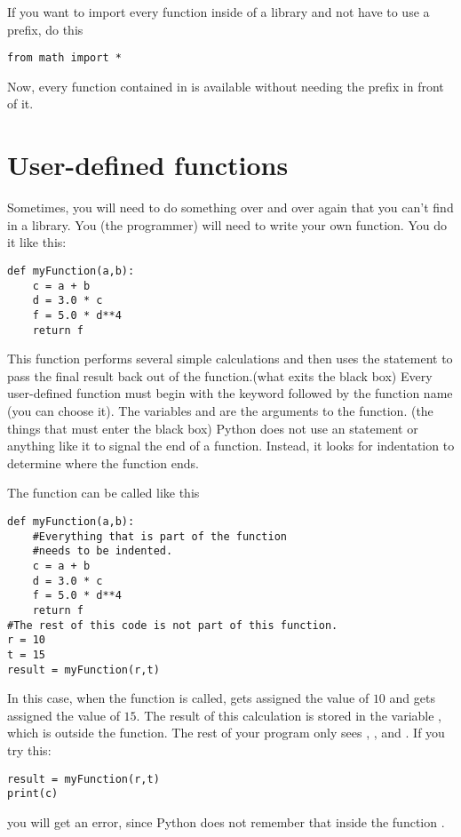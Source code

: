 If you want to import every function inside of a library and not have to use a prefix, do this
\begin{Verbatim}
from math import *
\end{Verbatim}
Now, every function contained in  is available without
needing the  prefix in front of it.

\section{User-defined functions}
Sometimes, you will need to do something over and over again that you can't find in a library.  You (the programmer) will need to write your own function. You do it like this:
\begin{Verbatim}
def myFunction(a,b):
    c = a + b
    d = 3.0 * c
    f = 5.0 * d**4
    return f
\end{Verbatim}
This function performs several simple calculations and then uses the
 statement to pass the final result back out of the
function.(what exits the black box) Every user-defined function must
begin with the keyword  followed by the function name (you
can choose it). The variables  and  are the
arguments to the function. (the things that must enter the black box)
Python does not use an  statement or anything like it to
signal the end of a function.  Instead, it looks for indentation to
determine where the function ends.

The function can be called like this
\begin{Verbatim}
def myFunction(a,b):
    #Everything that is part of the function
    #needs to be indented.
    c = a + b
    d = 3.0 * c
    f = 5.0 * d**4
    return f
#The rest of this code is not part of this function.
r = 10
t = 15
result = myFunction(r,t)
\end{Verbatim}
In this case, when the function is called,  gets assigned
the value of $10$ and  gets assigned the value of $15$.  The
result of this calculation is stored in the variable ,
which is outside the function.  The rest of your program only sees , , and .  If you try this:
\begin{Verbatim}
result = myFunction(r,t)
print(c)
\end{Verbatim}
you will get an error, since Python does not remember that inside the function .

